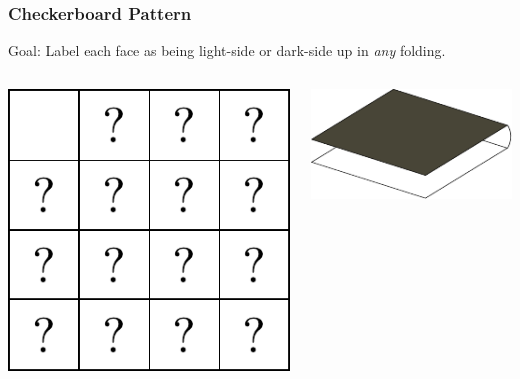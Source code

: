 \documentclass{beamer}
\begin{document}
\begin{frame}
\frametitle{Checkerboard Pattern}

\begin{block}{Goal:}
Label each face as being light-side or dark-side up in \textit{any} folding.
\end{block}

\bigskip

\begin{columns}[c]
\includegraphics[width=\textwidth]{sam_images/checkerboard-3.pdf}

\pause

\includegraphics[width=.9\textwidth]{sam_images/checkerboard-3a.pdf}


\end{columns}
\end{frame}
\end{document}
